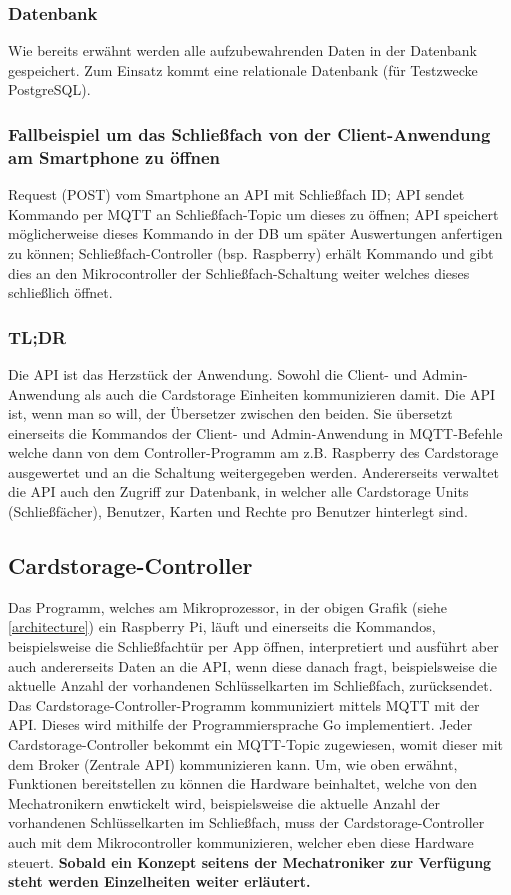 \documentclass[a4paper]{article}
\begin{document}
\subsubsection{Datenbank}
Wie bereits erwähnt werden alle aufzubewahrenden Daten in der Datenbank gespeichert. Zum Einsatz kommt eine relationale Datenbank (für Testzwecke PostgreSQL).

\subsubsection{Fallbeispiel um das Schließfach von der Client-Anwendung am Smartphone zu öffnen}
Request (POST) vom Smartphone an API mit Schließfach ID; API sendet Kommando per MQTT an Schließfach-Topic um dieses zu öffnen; API speichert möglicherweise dieses Kommando in der DB um später Auswertungen anfertigen zu können; Schließfach-Controller (bsp. Raspberry) erhält Kommando und gibt dies an den Mikrocontroller der Schließfach-Schaltung weiter welches dieses schließlich öffnet.   

\subsubsection{TL;DR}
Die API ist das Herzstück der Anwendung. Sowohl die Client- und Admin-Anwendung als auch die Cardstorage Einheiten kommunizieren damit. Die API ist, wenn man so will, der Übersetzer zwischen den beiden. Sie übersetzt einerseits die Kommandos der Client- und Admin-Anwendung in MQTT-Befehle welche dann von dem Controller-Programm am z.B. Raspberry des Cardstorage ausgewertet und an die Schaltung weitergegeben werden. Andererseits verwaltet die API auch den Zugriff zur Datenbank, in welcher alle Cardstorage Units (Schließfächer), Benutzer, Karten und Rechte pro Benutzer hinterlegt sind. 

\newpage

\subsection{Cardstorage-Controller}
Das Programm, welches am Mikroprozessor, in der obigen Grafik (siehe \autoref{architecture}) ein Raspberry Pi, läuft und einerseits die Kommandos, beispielsweise die Schließfachtür per App öffnen, interpretiert und ausführt aber auch andererseits Daten an die API, wenn diese danach fragt, beispielsweise die aktuelle Anzahl der vorhandenen Schlüsselkarten im Schließfach, zurücksendet. Das Cardstorage-Controller-Programm kommuniziert mittels MQTT mit der API. Dieses wird mithilfe der Programmiersprache Go implementiert. Jeder Cardstorage-Controller bekommt ein MQTT-Topic zugewiesen, womit dieser mit dem Broker (Zentrale API) kommunizieren kann. Um, wie oben erwähnt, Funktionen bereitstellen zu können die Hardware beinhaltet, welche von den Mechatronikern enwtickelt wird, beispielsweise die aktuelle Anzahl der vorhandenen Schlüsselkarten im Schließfach, muss der Cardstorage-Controller auch mit dem Mikrocontroller kommunizieren, welcher eben diese Hardware steuert. \textbf{Sobald ein Konzept seitens der Mechatroniker zur Verfügung steht werden Einzelheiten weiter erläutert.}
\end{document}
